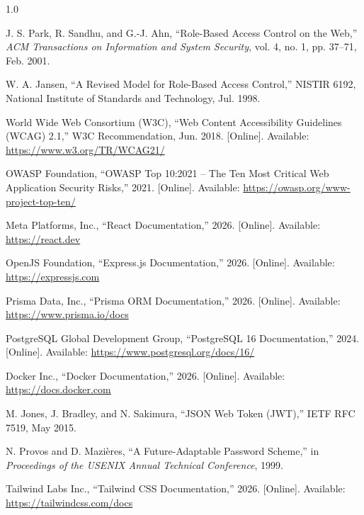\documentclass[12pt,oneside]{book}
\begin{document}
\begin{spacing}{1.0}
\begin{enumerate}[label={[\arabic*]}, leftmargin=2.2em, itemsep=6pt]
\item\label{ref7} J. S. Park, R. Sandhu, and G.-J. Ahn, ``Role-Based Access Control on the Web,'' \textit{ACM Transactions on Information and System Security}, vol. 4, no. 1, pp. 37--71, Feb. 2001.

\item\label{ref8} W. A. Jansen, ``A Revised Model for Role-Based Access Control,'' NISTIR 6192, National Institute of Standards and Technology, Jul. 1998.

\item\label{ref9} World Wide Web Consortium (W3C), ``Web Content Accessibility Guidelines (WCAG) 2.1,'' W3C Recommendation, Jun. 2018. [Online]. Available: \url{https://www.w3.org/TR/WCAG21/}

\item\label{ref10} OWASP Foundation, ``OWASP Top 10:2021 -- The Ten Most Critical Web Application Security Risks,'' 2021. [Online]. Available: \url{https://owasp.org/www-project-top-ten/}

\item\label{ref11} Meta Platforms, Inc., ``React Documentation,'' 2026. [Online]. Available: \url{https://react.dev}

\item\label{ref12} OpenJS Foundation, ``Express.js Documentation,'' 2026. [Online]. Available: \url{https://expressjs.com}

\item\label{ref13} Prisma Data, Inc., ``Prisma ORM Documentation,'' 2026. [Online]. Available: \url{https://www.prisma.io/docs}

\item\label{ref14} PostgreSQL Global Development Group, ``PostgreSQL 16 Documentation,'' 2024. [Online]. Available: \url{https://www.postgresql.org/docs/16/}

\item\label{ref15} Docker Inc., ``Docker Documentation,'' 2026. [Online]. Available: \url{https://docs.docker.com}

\item\label{ref16} M. Jones, J. Bradley, and N. Sakimura, ``JSON Web Token (JWT),'' IETF RFC 7519, May 2015.

\item\label{ref17} N. Provos and D. Mazi\`eres, ``A Future-Adaptable Password Scheme,'' in \textit{Proceedings of the USENIX Annual Technical Conference}, 1999.

\item\label{ref18} Tailwind Labs Inc., ``Tailwind CSS Documentation,'' 2026. [Online]. Available: \url{https://tailwindcss.com/docs}


\end{enumerate}
\end{spacing}
\end{document}
